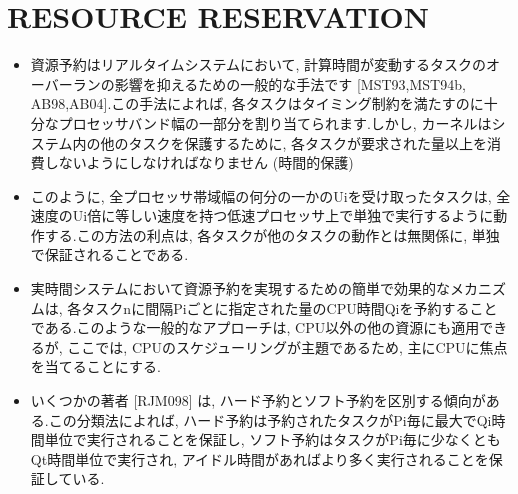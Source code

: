 

\section{RESOURCE RESERVATION}
\label{sec: resource reservation}

\begin{frame}{}
\begin{itemize}
\item 資源予約はリアルタイムシステムにおいて, 計算時間が変動するタスクのオーバーランの影響を抑えるための一般的な手法です [MST93,MST94b, AB98,AB04].この手法によれば, 各タスクはタイミング制約を満たすのに十分なプロセッサバンド幅の一部分を割り当てられます.しかし, カーネルはシステム内の他のタスクを保護するために, 各タスクが要求された量以上を消費しないようにしなければなりません (時間的保護)
\item このように, 全プロセッサ帯域幅の何分の一かのUiを受け取ったタスクは, 全速度のUi倍に等しい速度を持つ低速プロセッサ上で単独で実行するように動作する.この方法の利点は, 各タスクが他のタスクの動作とは無関係に, 単独で保証されることである.
\end{itemize}
\end{frame}

\begin{frame}{}
\begin{itemize}
\item 実時間システムにおいて資源予約を実現するための簡単で効果的なメカニズムは, 各タスクnに間隔Piごとに指定された量のCPU時間Qiを予約することである.このような一般的なアプローチは, CPU以外の他の資源にも適用できるが, ここでは, CPUのスケジューリングが主題であるため, 主にCPUに焦点を当てることにする.
\end{itemize}
\end{frame}

\begin{frame}{}
\begin{itemize}
\item いくつかの著者 [RJM098] は, ハード予約とソフト予約を区別する傾向がある.この分類法によれば, ハード予約は予約されたタスクがPi毎に最大でQi時間単位で実行されることを保証し, ソフト予約はタスクがPi毎に少なくともQt時間単位で実行され, アイドル時間があればより多く実行されることを保証している.
\end{itemize}
\end{frame}

